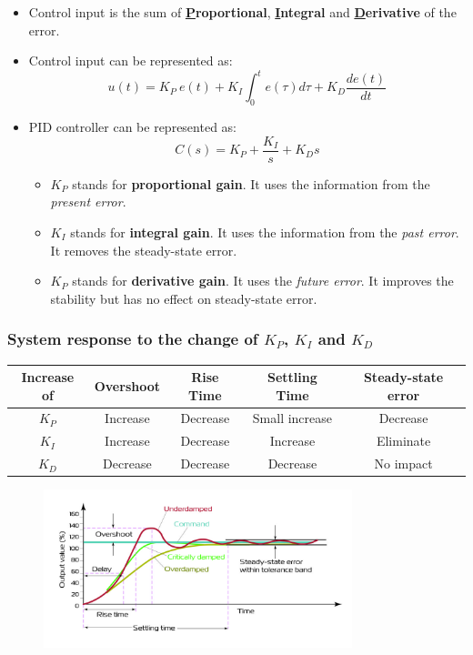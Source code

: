 \documentclass[12pt,a4paper]{article}
\begin{document}
\begin{itemize}
\item Control input is the sum of \textbf{\underline{P}roportional}, \textbf{\underline{I}ntegral} and \textbf{\underline{D}erivative} of the error.
\item Control input can be represented as:
\[u(t) = K_{P}\  e(t)+K_{I}\int_{0}^{t}e(\tau)d\tau + K_{D}\frac{de(t)}{dt}\]
\item PID controller can be represented as:
\[C(s) =K_{P}+\frac{K_{I}}{s}+K_{D}s \]
\begin{itemize}
 \item $K_{P}$ stands for \textbf{proportional gain}. It uses the information from the \textit{present error}.
 \item $K_{I}$ stands for \textbf{integral gain}. It uses the information from the \textit{past error}.
 It removes the steady-state error.
 \item $K_{P}$ stands for \textbf{derivative gain}. It uses the \textit{future error}. It improves the stability but has no effect on steady-state error.
\end{itemize}
\end{itemize}

\subsubsection{System response to the change of $K_{P}$, $K_{I}$ and $K_{D}$}
\begin{table}[H] \centering
\begin{tabular}{|c|c|c|c|c|} \hline
\textbf{Increase of} &\textbf{Overshoot}& \textbf{Rise Time} &\textbf{Settling Time}& \textbf{Steady-state error}\\ \hline
$K_{P}$&Increase&  Decrease& Small increase& Decrease\\ \hline
$K_{I}$&Increase &Decrease& Increase& Eliminate\\ \hline
$K_{D}$&Decrease& Decrease& Decrease& No impact\\ \hline
\end{tabular}
\end{table}
\begin{figure}[H] \centering
\includegraphics[width=0.8\textwidth]{images/PID_response.jpg}
\end{figure}
\end{document}
